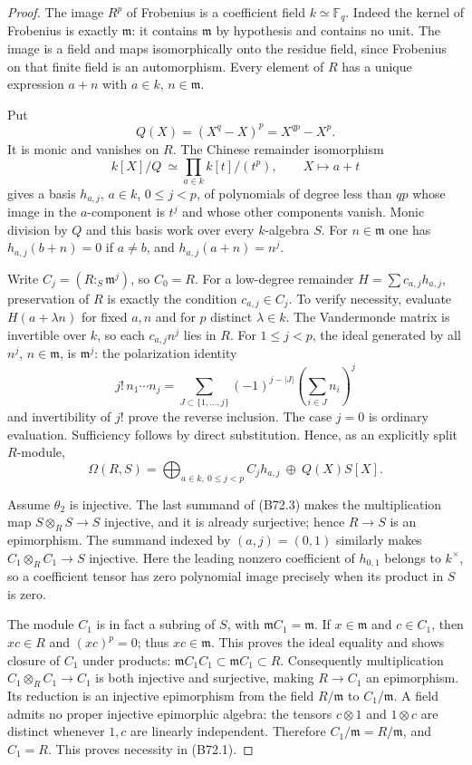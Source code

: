\begin{proof}
The image $R^p$ of Frobenius is a coefficient field $k\simeq\mathbb F_q$.
Indeed the kernel of Frobenius is exactly $\mathfrak m$: it contains
$\mathfrak m$ by hypothesis and contains no unit. The image is a field
and maps isomorphically onto the residue field, since Frobenius on that
finite field is an automorphism. Every element of $R$ has a unique
expression $a+n$ with $a\in k$, $n\in\mathfrak m$.

Put
\[
                    Q(X)=(X^q-X)^p=X^{qp}-X^p.
\]
It is monic and vanishes on $R$. The Chinese remainder isomorphism
\[
 k[X]/Q\ \simeq\prod_{a\in k}k[t]/(t^p),
 \qquad X\longmapsto a+t                              \tag{B72.2}
\]
gives a basis $h_{a,j}$, $a\in k$, $0\le j<p$, of polynomials of degree
less than $qp$ whose image in the $a$-component is $t^j$ and whose other
components vanish. Monic division by $Q$ and this basis work over every
$k$-algebra $S$. For $n\in\mathfrak m$ one has
$h_{a,j}(b+n)=0$ if $a\ne b$, and $h_{a,j}(a+n)=n^j$.

Write $C_j=(R:_S\mathfrak m^j)$, so $C_0=R$.
For a low-degree remainder $H=\sum c_{a,j}h_{a,j}$, preservation of $R$
is exactly the condition $c_{a,j}\in C_j$. To verify necessity, evaluate
$H(a+\lambda n)$ for fixed $a,n$ and for $p$ distinct $\lambda\in k$.
The Vandermonde matrix is invertible over $k$, so each $c_{a,j}n^j$ lies
in $R$. For $1\le j<p$, the ideal generated by all $n^j$, $n\in\mathfrak m$,
is $\mathfrak m^j$: the polarization identity
\[
 j!\,n_1\cdots n_j=
 \sum_{J\subset\{1,\ldots,j\}}(-1)^{j-|J|}
                         \left(\sum_{i\in J}n_i\right)^j
\]
and invertibility of $j!$ prove the reverse inclusion. The case $j=0$
is ordinary evaluation. Sufficiency follows by direct substitution.
Hence, as an explicitly split $R$-module,
\[
 \Omega(R,S)=\bigoplus_{a\in k,\ 0\le j<p} C_jh_{a,j}
                                \ \oplus\ Q(X)S[X].       \tag{B72.3}
\]

Assume $\theta_2$ is injective. The last summand of (B72.3) makes the
multiplication map $S\otimes_R S\to S$ injective, and it is already
surjective; hence $R\to S$ is an epimorphism. The summand indexed by
$(a,j)=(0,1)$ similarly makes $C_1\otimes_R C_1\to S$ injective.
Here the leading nonzero coefficient of $h_{0,1}$ belongs to $k^\times$,
so a coefficient tensor has zero polynomial image precisely when its
product in $S$ is zero.

The module $C_1$ is in fact a subring of $S$, with
$\mathfrak mC_1=\mathfrak m$. If $x\in\mathfrak m$ and $c\in C_1$,
then $xc\in R$ and $(xc)^p=0$; thus $xc\in\mathfrak m$.
This proves the ideal equality and shows closure of $C_1$ under products:
$\mathfrak m C_1C_1\subset\mathfrak mC_1\subset R$.
Consequently multiplication $C_1\otimes_R C_1\to C_1$ is both injective
and surjective, making $R\to C_1$ an epimorphism.
Its reduction is an injective epimorphism from the field
$R/\mathfrak m$ to $C_1/\mathfrak m$. A field admits no proper injective
epimorphic algebra: the tensors $c\otimes1$ and $1\otimes c$ are distinct
whenever $1,c$ are linearly independent. Therefore
$C_1/\mathfrak m=R/\mathfrak m$, and $C_1=R$.
This proves necessity in (B72.1).


\end{proof}
